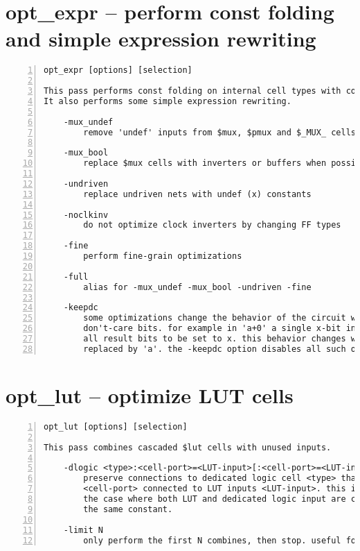 \section{opt\_expr -- perform const folding and simple expression rewriting}
\label{cmd:opt_expr}
\begin{lstlisting}[numbers=left,frame=single]
    opt_expr [options] [selection]

This pass performs const folding on internal cell types with constant inputs.
It also performs some simple expression rewriting.

    -mux_undef
        remove 'undef' inputs from $mux, $pmux and $_MUX_ cells

    -mux_bool
        replace $mux cells with inverters or buffers when possible

    -undriven
        replace undriven nets with undef (x) constants

    -noclkinv
        do not optimize clock inverters by changing FF types

    -fine
        perform fine-grain optimizations

    -full
        alias for -mux_undef -mux_bool -undriven -fine

    -keepdc
        some optimizations change the behavior of the circuit with respect to
        don't-care bits. for example in 'a+0' a single x-bit in 'a' will cause
        all result bits to be set to x. this behavior changes when 'a+0' is
        replaced by 'a'. the -keepdc option disables all such optimizations.
\end{lstlisting}

\section{opt\_lut -- optimize LUT cells}
\label{cmd:opt_lut}
\begin{lstlisting}[numbers=left,frame=single]
    opt_lut [options] [selection]

This pass combines cascaded $lut cells with unused inputs.

    -dlogic <type>:<cell-port>=<LUT-input>[:<cell-port>=<LUT-input>...]
        preserve connections to dedicated logic cell <type> that has ports
        <cell-port> connected to LUT inputs <LUT-input>. this includes
        the case where both LUT and dedicated logic input are connected to
        the same constant.

    -limit N
        only perform the first N combines, then stop. useful for debugging.
\end{lstlisting}

